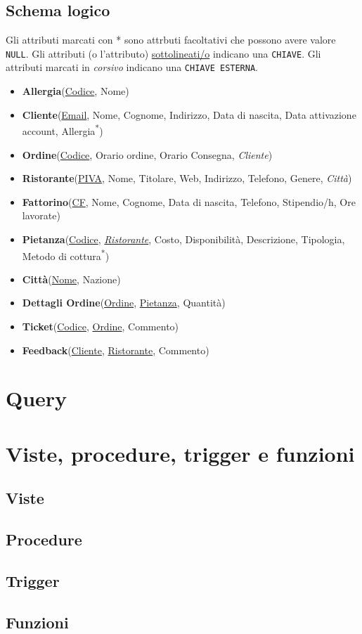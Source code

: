 \documentclass[10pt]{article}
\begin{document}
		\subsection{Schema logico}
		\begin{framed}
		\noindent Gli attributi marcati con * sono attrbuti facoltativi che possono avere valore \texttt{\color{blue}NULL}. \newline
		Gli attributi (o l'attributo) \underline{sottolineati/o} indicano una \texttt{CHIAVE}. \newline
		Gli attributi marcati in \textit{corsivo} indicano una \texttt{CHIAVE ESTERNA}.
		\end{framed}
		\begin{itemize}[noitemsep]
			\item[] \textbf{Allergia}(\underline{Codice}, Nome)
			\item[] \textbf{Cliente}(\underline{Email}, Nome, Cognome, Indirizzo, Data di nascita, Data attivazione account, Allergia\textsuperscript{*})
			\item[] \textbf{Ordine}(\underline{Codice}, Orario ordine, Orario Consegna, \textit{Cliente})
			\item[] \textbf{Ristorante}(\underline{PIVA}, Nome, Titolare, Web, Indirizzo, Telefono, Genere, \textit{Città})
			\item[] \textbf{Fattorino}(\underline{CF}, Nome, Cognome, Data di nascita, Telefono, Stipendio/h, Ore lavorate)			
			\item[] \textbf{Pietanza}(\underline{Codice}, \underline{\textit{Ristorante}}, Costo, Disponibilità, Descrizione, Tipologia, Metodo di cottura\textsuperscript{*})
			\item[] \textbf{Città}(\underline{Nome}, Nazione)
			\item[] \textbf{Dettagli Ordine}(\underline{Ordine}, \underline{Pietanza}, Quantità)
			\item[] \textbf{Ticket}(\underline{Codice}, \underline{Ordine}, Commento)
			\item[] \textbf{Feedback}(\underline{Cliente}, \underline{Ristorante}, Commento)
			
		\end{itemize}
	\section{Query}
	\section{Viste, procedure, trigger e funzioni}
		\subsection{Viste}
		\subsection{Procedure}
		\subsection{Trigger}
		\subsection{Funzioni}
	
\end{document}
